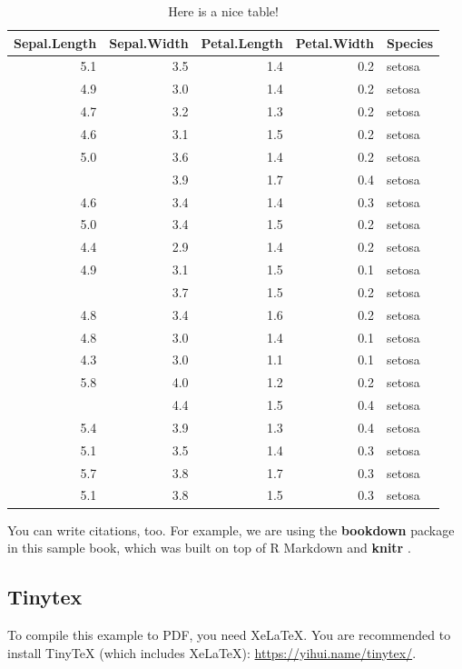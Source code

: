 \documentclass[
  fontsize=13pt,
  english,
  a4paper,
  openany, a4paper, oneside]{article}
\begin{document}
\begin{table}

\caption{\label{tab:nice-tab}Here is a nice table!}
\centering
\begin{tabular}[t]{rrrrl}
\toprule
Sepal.Length & Sepal.Width & Petal.Length & Petal.Width & Species\\
\midrule
5.1 & 3.5 & 1.4 & 0.2 & setosa\\
4.9 & 3.0 & 1.4 & 0.2 & setosa\\
4.7 & 3.2 & 1.3 & 0.2 & setosa\\
4.6 & 3.1 & 1.5 & 0.2 & setosa\\
5.0 & 3.6 & 1.4 & 0.2 & setosa\\
\addlinespace
5.4 & 3.9 & 1.7 & 0.4 & setosa\\
4.6 & 3.4 & 1.4 & 0.3 & setosa\\
5.0 & 3.4 & 1.5 & 0.2 & setosa\\
4.4 & 2.9 & 1.4 & 0.2 & setosa\\
4.9 & 3.1 & 1.5 & 0.1 & setosa\\
\addlinespace
5.4 & 3.7 & 1.5 & 0.2 & setosa\\
4.8 & 3.4 & 1.6 & 0.2 & setosa\\
4.8 & 3.0 & 1.4 & 0.1 & setosa\\
4.3 & 3.0 & 1.1 & 0.1 & setosa\\
5.8 & 4.0 & 1.2 & 0.2 & setosa\\
\addlinespace
5.7 & 4.4 & 1.5 & 0.4 & setosa\\
5.4 & 3.9 & 1.3 & 0.4 & setosa\\
5.1 & 3.5 & 1.4 & 0.3 & setosa\\
5.7 & 3.8 & 1.7 & 0.3 & setosa\\
5.1 & 3.8 & 1.5 & 0.3 & setosa\\
\bottomrule
\end{tabular}
\end{table}

You can write citations, too. For example, we are using the \textbf{bookdown} package \citep{R-bookdown} in this sample book, which was built on top of R Markdown and \textbf{knitr} \citep{xie2015}.

\hypertarget{tinytex}{%
\subsection{Tinytex}\label{tinytex}}

To compile this example to PDF, you need XeLaTeX. You are recommended to install TinyTeX (which includes XeLaTeX): \url{https://yihui.name/tinytex/}.

  
\end{document}
